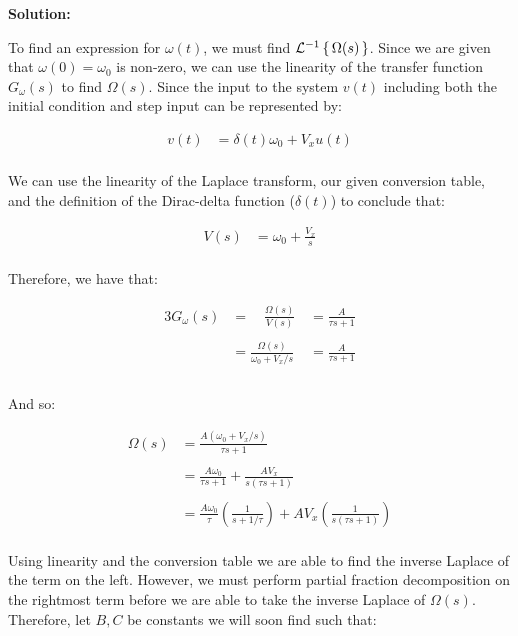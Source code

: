 \documentclass[10pt]{article}
\newenvironment{solution}{
	\vspace{1em}\par\large\textbf{{Solution:}}\par\vspace{1em}
}{
	\vspace{1em}
	\newpage
}
\newcounter{step}
\begin{document}
\begin{solution}
	To find an expression for $\omega(t)$, we must find $\mathcal{L}^{-1}\set{\Omega(s)}$. Since we are given that $\omega(0) = \omega_{0}$ is non-zero, we can use the linearity of the transfer function $G_{\omega}(s)$ to find $\Omega(s)$. Since the input to the system $v(t)$ including both the initial condition and step input can be represented by:

	\begin{align*}
		v(t) &= \delta(t)\omega_{0} + V_{x}u(t) \\
	\end{align*}

	We can use the linearity of the Laplace transform, our given conversion table, and the definition of the Dirac-delta function ($\delta(t)$) to conclude that:

	\begin{align*}
		V(s) &= \omega_{0} + \frac{V_{x}}{s} \\
	\end{align*}

	Therefore, we have that:

	\begin{alignat*}{3}
		G_{\omega}(s) &= \quad \frac{\Omega(s)}{V(s)} &= \frac{A}{\tau{s} + 1} \\\\
		&= \frac{\Omega(s)}{\omega_{0} + V_{x} / {s}} \; &= \frac{A}{\tau{s} + 1} \\\\
	\end{alignat*}

	And so:

	\begin{align*}
		\Omega(s) &= \frac{A(\omega_{0} + V_{x} / s)}{\tau{s} + 1} \\\\
		&= \frac{A\omega_{0}}{\tau{s} + 1} + \frac{A{V}_{x}}{s(\tau{s} + 1)} \\\\
		&= \frac{A\omega_{0}}{\tau} \left( \frac{1}{s + 1 / \tau} \right) + A{V}_{x} \left( \frac{1}{s(\tau{s} + 1)} \right) \\
	\end{align*}

	Using linearity and the conversion table we are able to find the inverse Laplace of the term on the left. However, we must perform partial fraction decomposition on the rightmost term before we are able to take the inverse Laplace of $\Omega(s)$. Therefore, let $B, C$ be constants we will soon find such that:


\end{solution}
\end{document}
